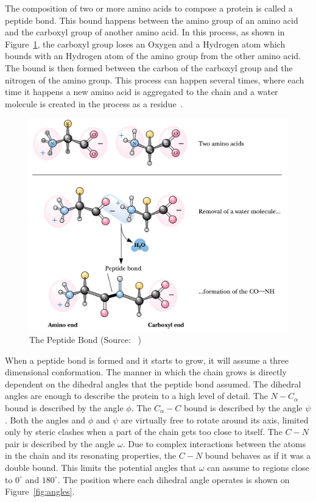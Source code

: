The composition of two or more amino acids to compose a protein is called
a peptide bond. This bound happens between the amino group of an amino acid
and the carboxyl group of another amino acid. In this process, as shown in
Figure~\ref{fig:peptide-bond}, the carboxyl group loses an Oxygen and a Hydrogen
atom which bounds with an Hydrogen atom of the amino group from the other amino acid. The bound is then formed between the carbon of the carboxyl group and the nitrogen of the amino group. This process can happen several times, where each time it happens a new amino acid is aggregated to the chain and a water molecule is created in the process as a
residue~\cite{garrett1999biochemistry}.

\begin{figure}
    \centering
    \includegraphics[width=\textwidth]{Figuras/peptide-bond.png}
    \caption{The Peptide Bond (Source: ~\cite{garrett1999biochemistry})}
    \label{fig:peptide-bond}
\end{figure}

When a peptide bond is formed and it starts to grow, it will assume a three dimensional conformation. The manner in which the chain grows is directly dependent on the dihedral angles that the peptide bond assumed. The dihedral angles are enough to describe the protein to a high level of detail. The $N - C_\alpha$ bound is described by the angle $\phi$. The $C_\alpha - C$ bound is described by the angle $\psi$. Both the angles and $\phi$ and $\psi$ are virtually free to rotate around its axis, limited only by steric clashes when a part of the chain gets too close to itself. The $C - N$ pair is described by the angle $\omega$. Due to complex interactions between the atoms in the chain and its resonating properties, the $C - N$ bound behaves as if it was a double bound. This limits the potential angles that $\omega$ can assume to regions close to $0^{\circ}$ and $180^{\circ}$. The position where each dihedral angle operates is shown on
Figure~\ref{fig:angles}.

